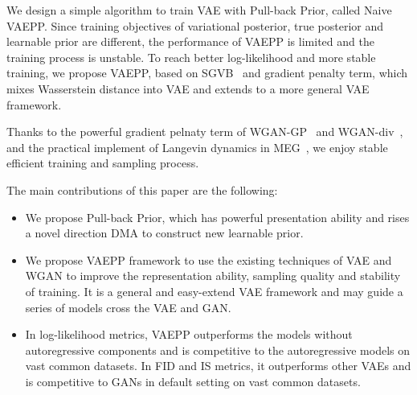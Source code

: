 We design a simple algorithm to train VAE with Pull-back Prior, called Naive VAEPP. Since training objectives of variational posterior, true posterior and learnable prior are different, the performance of VAEPP is limited and the training process is unstable. To reach better log-likelihood and more stable training, we propose VAEPP, based on SGVB~\cite{kingma2014auto} and gradient penalty term, which mixes Wasserstein distance into VAE and extends to a more general VAE framework. 

Thanks to the powerful gradient pelnaty term of WGAN-GP~\cite{gulrajani2017improved} and WGAN-div~\cite{wu2018wasserstein}, and the practical implement of Langevin dynamics in MEG~\cite{kumar2019maximum}, we enjoy stable efficient training and sampling process. 

The main contributions of this paper are the following:
\begin{itemize}
	\item We propose Pull-back Prior, which has powerful presentation ability and rises a novel direction DMA to construct new learnable prior. 
	\item We propose VAEPP framework to use the existing techniques of VAE and WGAN to improve the representation ability, sampling quality and stability of training. It is a general and easy-extend VAE framework and may guide a series of models cross the VAE and GAN. 
	\item In log-likelihood metrics, VAEPP outperforms the models without autoregressive components and is competitive to the autoregressive models on vast common datasets. In FID and IS metrics, it outperforms other VAEs and is competitive to GANs in default setting on vast common datasets. 
\end{itemize}
